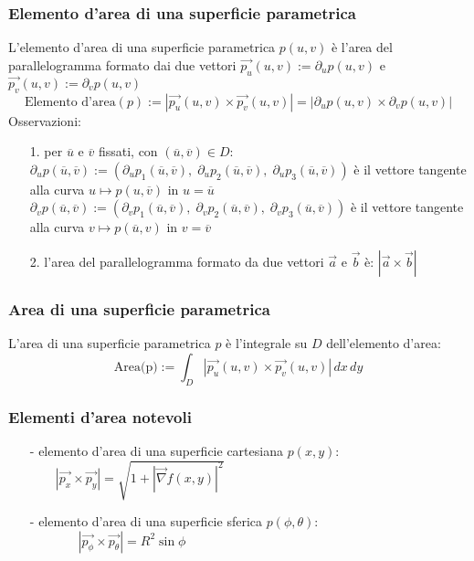 \documentclass[a4paper]{article}
\newcommand\nab{\vec{\nabla}} %
\begin{document}
\subsubsection*{Elemento d'area di una superficie parametrica}
L'elemento d'area di una superficie parametrica \(p(u,v)\) è l'area del parallelogramma formato dai due vettori
\(\vec{p_u}(u,v) := \partial_u p(u,v)\) e \(\vec{p_v}(u,v) := \partial_v p(u,v)\)
\[\text{Elemento d'area}(p) := \left| \vec{p_u}(u,v) \times \vec{p_v}(u,v)\right| = \left| \partial_u p(u,v) \times \partial_v p(u,v) \right|\]
Osservazioni:
\begin{itemize}[topsep=3pt, itemsep=0pt]
	\item[1.] per \(\overline{u}\) e \(\overline{v}\) fissati, con \((\overline{u}, \overline{v}) \in D\): \\
	\(\partial_u p(\overline{u},\overline{v}) := (\partial_u p_1(\overline{u}, \overline{v}), \; \partial_u p_2(\overline{u}, \overline{v}), \; \partial_u p_3(\overline{u}, \overline{v}))\)
	è il vettore tangente alla curva \(u \mapsto p(u,\overline{v})\) in \(u = \overline{u}\) \\
	\(\partial_v p(\overline{u},\overline{v}) := (\partial_v p_1(\overline{u}, \overline{v}), \; \partial_v p_2(\overline{u}, \overline{v}), \; \partial_v p_3(\overline{u}, \overline{v}))\)
	è il vettore tangente alla curva \(v \mapsto p(\overline{u},v)\) in \(v = \overline{v}\)
	\item[2.] l'area del parallelogramma formato da due vettori \(\vec{a}\) e \(\vec{b}\) è: \(\left| \vec{a} \times \vec{b}\right|\)
\end{itemize}

\subsubsection*{Area di una superficie parametrica}
L'area di una superficie parametrica \(p\) è l'integrale su \(D\) dell'elemento d'area:
\[\text{Area(p)} := \int_D \left|\vec{p_u} (u,v) \times \vec{p_v} (u,v)\right| \, dx \, dy\]

\subsubsection*{Elementi d'area notevoli}
\begin{itemize}
	\item[-] elemento d'area di una superficie cartesiana \(p(x,y)\): \(\qquad \left| \vec{p_x} \times \vec{p_y} \right| = \sqrt{1 + \left| \nab f(x,y)\right|^2}\)
	\item[-] elemento d'area di una superficie sferica \(p(\phi, \theta)\): \(\qquad \quad \;\;\:\! \left| \vec{p_\phi} \times \vec{p_\theta} \right| = R^2 \sin \phi\)
\end{itemize}
\end{document}
